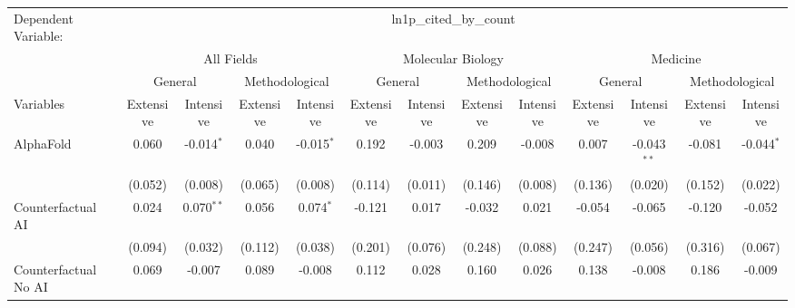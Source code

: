 \begingroup
\centering
\begin{tabular}{lcccccccccccc}
   \tabularnewline \midrule \midrule
   Dependent Variable: & \multicolumn{12}{c}{ln1p\_cited\_by\_count}\\
 & \multicolumn{4}{c}{All Fields} & \multicolumn{4}{c}{Molecular Biology} & \multicolumn{4}{c}{Medicine} \\
\cmidrule(lr){2-5} \cmidrule(lr){6-9} \cmidrule(lr){10-13}
 & \multicolumn{2}{c}{General} & \multicolumn{2}{c}{Methodological} & \multicolumn{2}{c}{General} & \multicolumn{2}{c}{Methodological} & \multicolumn{2}{c}{General} & \multicolumn{2}{c}{Methodological} \\
\cmidrule(lr){2-3} \cmidrule(lr){4-5} \cmidrule(lr){6-7} \cmidrule(lr){8-9} \cmidrule(lr){10-11} \cmidrule(lr){12-13}
Variables & \multicolumn{1}{c}{Extensive} & \multicolumn{1}{c}{Intensive} & \multicolumn{1}{c}{Extensive} & \multicolumn{1}{c}{Intensive} & \multicolumn{1}{c}{Extensive} & \multicolumn{1}{c}{Intensive} & \multicolumn{1}{c}{Extensive} & \multicolumn{1}{c}{Intensive} & \multicolumn{1}{c}{Extensive} & \multicolumn{1}{c}{Intensive} & \multicolumn{1}{c}{Extensive} & \multicolumn{1}{c}{Intensive} \\
\cmidrule(lr){1-1}\cmidrule(lr){2-2} \cmidrule(lr){3-3} \cmidrule(lr){4-4} \cmidrule(lr){5-5} \cmidrule(lr){6-6} \cmidrule(lr){7-7} \cmidrule(lr){8-8} \cmidrule(lr){9-9} \cmidrule(lr){10-10} \cmidrule(lr){11-11} \cmidrule(lr){12-12} \cmidrule(lr){13-13}
   AlphaFold                                & 0.060         & -0.014$^{*}$ & 0.040   & -0.015$^{*}$ & 0.192        & -0.003  & 0.209        & -0.008  & 0.007   & -0.043$^{**}$ & -0.081  & -0.044$^{*}$\\   
                                            & (0.052)       & (0.008)      & (0.065) & (0.008)      & (0.114)      & (0.011) & (0.146)      & (0.008) & (0.136) & (0.020)       & (0.152) & (0.022)\\   
   Counterfactual AI                        & 0.024         & 0.070$^{**}$ & 0.056   & 0.074$^{*}$  & -0.121       & 0.017   & -0.032       & 0.021   & -0.054  & -0.065        & -0.120  & -0.052\\   
                                            & (0.094)       & (0.032)      & (0.112) & (0.038)      & (0.201)      & (0.076) & (0.248)      & (0.088) & (0.247) & (0.056)       & (0.316) & (0.067)\\   
   Counterfactual No AI                     & 0.069         & -0.007       & 0.089   & -0.008       & 0.112        & 0.028   & 0.160        & 0.026   & 0.138   & -0.008        & 0.186   & -0.009\\   

\end{tabular}
